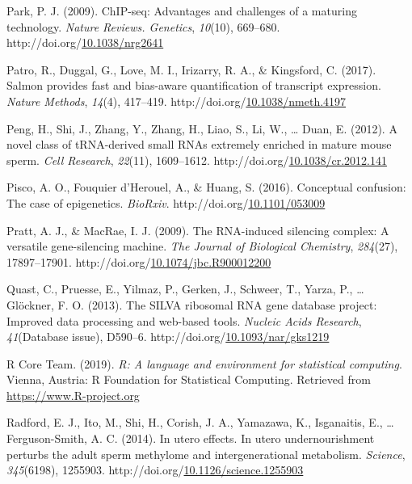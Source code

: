 \documentclass[12pt,twoside]{reedthesis}
\newlength{\cslhangindent}
\newenvironment{CSLReferences}[2] %
 {%
  \setlength{\parindent}{0pt}
  \ifodd #1 \everypar{\setlength{\hangindent}{\cslhangindent}}\ignorespaces\fi
  \ifnum #2 > 0
  \setlength{\parskip}{#2\baselineskip}
  \fi
 }%
 {}
\begin{document}
\begin{CSLReferences}{1}{0}
\leavevmode{}%
Park, P. J. (2009). ChIP-seq: Advantages and challenges of a maturing technology. \emph{Nature Reviews. Genetics}, \emph{10}(10), 669--680. http://doi.org/\href{https://doi.org/10.1038/nrg2641}{10.1038/nrg2641}

\leavevmode{}%
Patro, R., Duggal, G., Love, M. I., Irizarry, R. A., \& Kingsford, C. (2017). Salmon provides fast and bias-aware quantification of transcript expression. \emph{Nature Methods}, \emph{14}(4), 417--419. http://doi.org/\href{https://doi.org/10.1038/nmeth.4197}{10.1038/nmeth.4197}

\leavevmode{}%
Peng, H., Shi, J., Zhang, Y., Zhang, H., Liao, S., Li, W., \ldots{} Duan, E. (2012). A novel class of tRNA-derived small RNAs extremely enriched in mature mouse sperm. \emph{Cell Research}, \emph{22}(11), 1609--1612. http://doi.org/\href{https://doi.org/10.1038/cr.2012.141}{10.1038/cr.2012.141}

\leavevmode{}%
Pisco, A. O., Fouquier d'Herouel, A., \& Huang, S. (2016). Conceptual confusion: The case of epigenetics. \emph{BioRxiv}. http://doi.org/\href{https://doi.org/10.1101/053009}{10.1101/053009}

\leavevmode{}%
Pratt, A. J., \& MacRae, I. J. (2009). The RNA-induced silencing complex: A versatile gene-silencing machine. \emph{The Journal of Biological Chemistry}, \emph{284}(27), 17897--17901. http://doi.org/\href{https://doi.org/10.1074/jbc.R900012200}{10.1074/jbc.R900012200}

\leavevmode{}%
Quast, C., Pruesse, E., Yilmaz, P., Gerken, J., Schweer, T., Yarza, P., \ldots{} Glöckner, F. O. (2013). The SILVA ribosomal RNA gene database project: Improved data processing and web-based tools. \emph{Nucleic Acids Research}, \emph{41}(Database issue), D590--6. http://doi.org/\href{https://doi.org/10.1093/nar/gks1219}{10.1093/nar/gks1219}

\leavevmode{}%
R Core Team. (2019). \emph{R: A language and environment for statistical computing}. Vienna, Austria: R Foundation for Statistical Computing. Retrieved from \url{https://www.R-project.org}

\leavevmode{}%
Radford, E. J., Ito, M., Shi, H., Corish, J. A., Yamazawa, K., Isganaitis, E., \ldots{} Ferguson-Smith, A. C. (2014). In utero effects. In utero undernourishment perturbs the adult sperm methylome and intergenerational metabolism. \emph{Science}, \emph{345}(6198), 1255903. http://doi.org/\href{https://doi.org/10.1126/science.1255903}{10.1126/science.1255903}


\end{CSLReferences}
\end{document}
